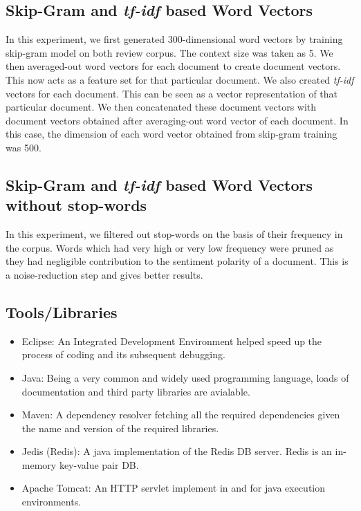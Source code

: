 \subsection{Skip-Gram and \emph{tf-idf} based Word Vectors}
In this experiment, we first generated 300-dimensional word vectors by training skip-gram model on both review corpus. The context size was taken as 5. We then averaged-out word vectors for each document to create document vectors. This now acts as a feature set for that particular document.
We also created \emph{tf-idf} vectors for each document. This can be seen as a vector representation of that particular document. We then concatenated these document vectors with document vectors obtained after averaging-out word vector of each document. In this case, the dimension of each word vector obtained from skip-gram training was 500.

\subsection{Skip-Gram and \emph{tf-idf} based Word Vectors without stop-words}
In this experiment, we filtered out stop-words on the basis of their frequency in the corpus. Words which had very high or very low frequency were pruned as they had negligible contribution to the sentiment polarity of a document. This is a noise-reduction step and gives better results.
		\subsection{Tools/Libraries}
\begin{itemize}
	\item Eclipse: An Integrated Development Environment helped speed up the process of coding and its subsequent debugging.
	\item Java: Being a very common and widely used programming language, loads of  documentation and third party libraries are avialable.
	\item Maven: A dependency resolver fetching all the required dependencies given the name and version of the required libraries.
	\item Jedis (Redis): A java implementation of the Redis DB server. Redis is an in-memory key-value pair DB.
	\item Apache Tomcat: An HTTP servlet implement in and for java execution environments.
\end{itemize}

